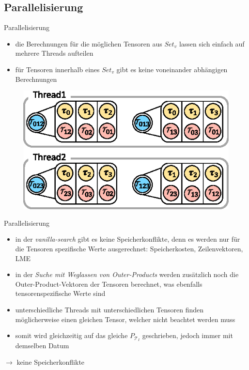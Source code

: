 \documentclass{beamer}
\newcommand{\Tau}{\bm{\mathcal{T}}}
\begin{document}
\subsection{Parallelisierung}

\begin{frame}{Parallelisierung}
	\begin{itemize}
		\item die Berechnungen für die möglichen Tensoren aus $Set_v$ lassen sich einfach auf mehrere Threads aufteilen
		\item für Tensoren innerhalb eines $Set_v$ gibt es keine voneinander abhängigen Berechnungen
	\end{itemize}
	\begin{figure}
		\includegraphics{figure_07}
	\end{figure}
\end{frame}

\begin{frame}{Parallelisierung}
	\begin{itemize}
		\item in der \textit{vanilla-search} gibt es keine Speicherkonflikte, denn es werden nur für die Tensoren spezifische Werte ausgerechnet: Speicherkosten, Zeilenvektoren, LME \pause
		\item in der \textit{Suche mit Weglassen von Outer-Products} werden zusätzlich noch die Outer-Product-Vektoren der Tensoren berechnet, was ebenfalls tensorenspezifische Werte sind
		\item unterschiedliche Threads mit unterschiedlichen Tensoren finden möglicherweise einen gleichen Tensor, welcher nicht beachtet werden muss
		\item somit wird gleichzeitig auf das gleiche $P_{\Tau_I}$ geschrieben, jedoch immer mit demselben Datum
	\end{itemize} \pause
	$\rightarrow$ keine Speicherkonflikte
\end{frame}
\end{document}
